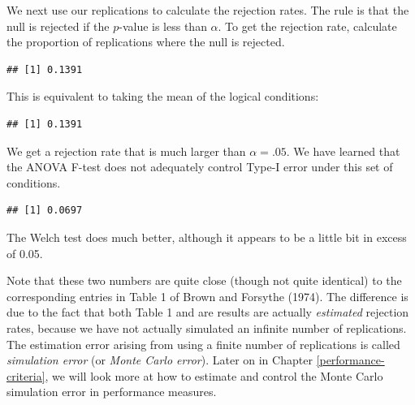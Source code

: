 \documentclass[
]{book}
\newenvironment{Shaded}{\begin{snugshade}}{\end{snugshade}}
\newcommand{\DecValTok}[1]{\textcolor[rgb]{0.00,0.00,0.81}{#1}}
\newcommand{\FloatTok}[1]{\textcolor[rgb]{0.00,0.00,0.81}{#1}}
\newcommand{\FunctionTok}[1]{\textcolor[rgb]{0.13,0.29,0.53}{\textbf{#1}}}
\newcommand{\NormalTok}[1]{#1}
\newcommand{\SpecialCharTok}[1]{\textcolor[rgb]{0.81,0.36,0.00}{\textbf{#1}}}
\begin{document}
We next use our replications to calculate the rejection rates.
The rule is that the null is rejected if the \(p\)-value is less than \(\alpha\). To get the rejection rate, calculate the proportion of replications where the null is rejected.

\begin{Shaded}
\end{Shaded}

\begin{verbatim}
## [1] 0.1391
\end{verbatim}

This is equivalent to taking the mean of the logical conditions:

\begin{Shaded}
\end{Shaded}

\begin{verbatim}
## [1] 0.1391
\end{verbatim}

We get a rejection rate that is much larger than \(\alpha = .05\).
We have learned that the ANOVA F-test does not adequately control Type-I error under this set of conditions.

\begin{Shaded}
\end{Shaded}

\begin{verbatim}
## [1] 0.0697
\end{verbatim}

The Welch test does much better, although it appears to be a little bit in excess of 0.05.

Note that these two numbers are quite close (though not quite identical) to the corresponding entries in Table 1 of Brown and Forsythe (1974). The difference is due to the fact that both Table 1 and are results are actually \emph{estimated} rejection rates, because we have not actually simulated an infinite number of replications. The estimation error arising from using a finite number of replications is called \emph{simulation error} (or \emph{Monte Carlo error}).
Later on in Chapter \ref{performance-criteria}, we will look more at how to estimate and control the Monte Carlo simulation error in performance measures.
\end{document}
